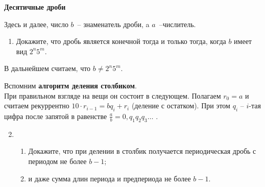 \documentclass{article}
\begin{document}
\large
	

\begin{center}
\textbf{Десятичные дроби}
\end{center}

Здесь и далее, число $b$~-- знаменатель дроби, a $a$~--числитель.

\begin{enumerate}[label*=\protect\fbox{\arabic{enumi}}]

\item Докажите, что дробь является конечной тогда и только тогда, когда $b$ имеет вид $2^n5^m$.

\end{enumerate}

{В дальнейшем считаем, что $b\neq 2^n5^m$.}

Вспомним {\bf алгоритм деления столбиком}.\\
При правильном взгляде на вещи он состоит в следующем. Полагаем $r_0=a$ и считаем рекуррентно $10\cdot r_{i-1}=bq_i+r_i$  (деление с остатком). При этом $q_i$ -- $i$-тая цифра после запятой в равенстве $\frac{a}{b}=0,q_1q_2q_3\dots$ .

\begin{enumerate}[label*=\protect\fbox{\arabic{enumi}}]
	
\setcounter{enumi}{1}
\item 
\begin{enumerate}
	\item Докажите, что при делении в столбик получается периодическая дробь с периодом не более $b-1$;
	\item и даже сумма длин периода и предпериода не более $b-1$.
\end{enumerate}

\end{enumerate}
\end{document}
